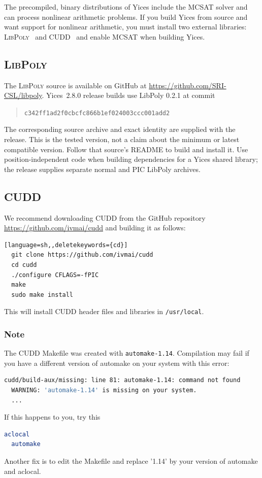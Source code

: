 \documentclass[11pt,twoside,fleqn,openright,titlepage]{cslreport}
\begin{document}
\medskip\noindent
The precompiled, binary distributions of Yices include the MCSAT
solver and can process nonlinear arithmetic problems. If you build
Yices from source and want support for nonlinear arithmetic, you must
install two external libraries: \textsc{LibPoly}~\cite{Jovanovic+Dutertre:libpoly:2017}
and CUDD~\cite{Somenzi:cudd:1998} and enable MCSAT when building Yices.

\subsection*{\textsc{LibPoly}}

The \textsc{LibPoly} source is available on GitHub
at \url{https://github.com/SRI-CSL/libpoly}. Yices~2.8.0 release builds use
LibPoly 0.2.1 at commit
\begin{quote}
\texttt{c342ff1ad2f0cbcfc866b1ef024003ccc001add2}
\end{quote}
The corresponding source archive and exact identity are supplied with the
release. This is the tested version, not a claim about the minimum or latest
compatible version. Follow that source's README to build and install it.
Use position-independent code when building dependencies for a Yices shared
library; the release supplies separate normal and PIC LibPoly archives.

\subsection*{CUDD}

We recommend downloading CUDD from the GitHub repository
\url{https://github.com/ivmai/cudd} and building it as follows:
\begin{small}
\begin{lstlisting}[language=sh,,deletekeywords={cd}]
  git clone https://github.com/ivmai/cudd
  cd cudd
  ./configure CFLAGS=-fPIC
  make
  sudo make install
\end{lstlisting}
\end{small}
This will install CUDD header files and libraries in \texttt{/usr/local}.

\subsubsection*{Note}
The CUDD Makefile was created with \texttt{automake-1.14}. Compilation may fail if you
have a different version of automake on your system with this error:
\begin{small}
\begin{lstlisting}[language=sh]
  cudd/build-aux/missing: line 81: automake-1.14: command not found
  WARNING: 'automake-1.14' is missing on your system.
  ...
\end{lstlisting}
\end{small}
If this happens to you, try this
\begin{small}
\begin{lstlisting}[language=sh]
  aclocal
  automake
\end{lstlisting}
\end{small}
Another fix is to edit the Makefile and replace '1.14' by your version of automake and aclocal.
\end{document}
